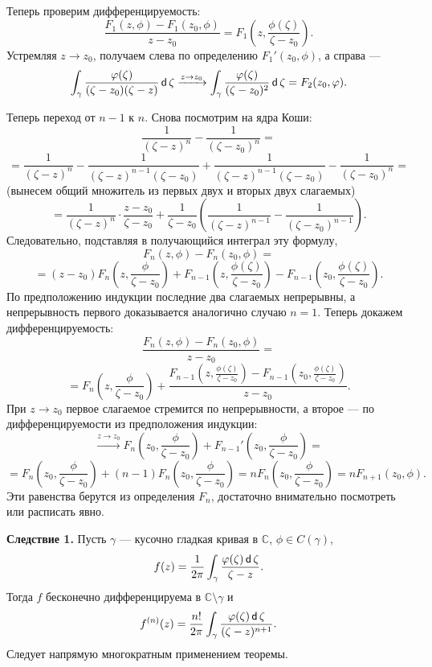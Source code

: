 Теперь проверим дифференцируемость:
\[
    \frac{F_1(z, \phi) - F_1(z_0, \phi)}{z - z_0} = F_1 \left(z, \frac{\phi(\zeta)}{\zeta - z_0} \right).
\]
Устремляя $z \to z_0$, получаем слева по определению $F_1'(z_0, \phi)$, а справа ---
\[
    \int_\gamma \frac{\varphi(\zeta)}{(\zeta - z_0)(\zeta - z)} \operatorname{\mathsf d} \zeta \xrightarrow{z \to z_0} \int_\gamma \frac{\varphi(\zeta)}{(\zeta - z_0)^2} \operatorname{\mathsf d} \zeta = F_2(z_0, \varphi).
\]

Теперь переход от $n - 1$ к $n$.
Снова посмотрим на ядра Коши:
\[
    \frac{1}{(\zeta - z)^n} - \frac{1}{(\zeta - z_0)^n} = 
\]
\[
    = \frac{1}{(\zeta - z)^n} - \frac{1}{(\zeta - z)^{n-1}(\zeta - z_0)} + \frac{1}{(\zeta - z)^{n-1}(\zeta - z_0)} - \frac{1}{(\zeta - z_0)^n} =
\]
(вынесем общий множитель из первых двух и вторых двух слагаемых)
\[
    = \frac{1}{(\zeta - z)^n} \cdot \frac{z - z_0}{\zeta - z_0} + \frac{1}{\zeta - z_0} \left( \frac{1}{(\zeta - z)^{n-1}} - \frac{1}{(\zeta - z_0)^{n-1}} \right).
\]
Следовательно, подставляя в получающийся интеграл эту формулу,
\[
    F_n(z, \phi) - F_n(z_0, \phi) = 
\]
\[
    = (z - z_0) F_n \left(z, \frac{\phi}{\zeta - z_0} \right) + F_{n-1} \left(z, \frac{\phi(\zeta)}{\zeta - z_0} \right) - F_{n-1} \left(z_0, \frac{\phi(\zeta)}{\zeta - z_0} \right).
\]
По предположению индукции последние два слагаемых непрерывны, а непрерывность первого доказывается аналогично случаю $n = 1$.
Теперь докажем дифференцируемость:
\[
    \frac{F_n(z, \phi) - F_n(z_0, \phi)}{z - z_0} =
\]
\[
    = F_n \left(z, \frac{\phi}{\zeta - z_0} \right) + \frac{F_{n-1} \left(z, \frac{\phi(\zeta)}{\zeta - z_0} \right) - F_{n-1} \left(z_0, \frac{\phi(\zeta)}{\zeta - z_0} \right)}{z - z_0}.
\]
При $z \to z_0$ первое слагаемое стремится по непрерывности, а второе --- по дифференцируемости из предположения индукции:
\[
    \xrightarrow{z \to z_0} F_n \left(z_0, \frac{\phi}{\zeta - z_0} \right) + F_{n-1}' \left(z_0, \frac{\phi}{\zeta - z_0} \right) =
\]
\[
    = F_n \left(z_0, \frac{\phi}{\zeta - z_0} \right) + (n - 1) F_n \left( z_0, \frac{\phi}{\zeta - z_0} \right) = n F_n \left( z_0, \frac{\phi}{\zeta - z_0} \right) = n F_{n+1}(z_0, \phi).
\]
Эти равенства берутся из определения $F_n$, достаточно внимательно посмотреть или расписать явно.

\QED

\textbf{Следствие 1.} Пусть $\gamma$ --- кусочно гладкая кривая в $\mathbb C$, $\phi \in C(\gamma)$,
\[
    f(z) = \frac{1}{2\pi} \int_\gamma \frac{\varphi(\zeta) \operatorname{\mathsf d} \zeta}{\zeta - z}.
\]
Тогда $f$ бесконечно дифференцируема в $\mathbb C \setminus \gamma$ и
\[
    f^{(n)}(z) = \frac{n!}{2\pi} \int_\gamma \frac{\varphi(\zeta) \operatorname{\mathsf d} \zeta}{(\zeta - z)^{n+1}}.
\]
Следует напрямую многократным применением теоремы.

